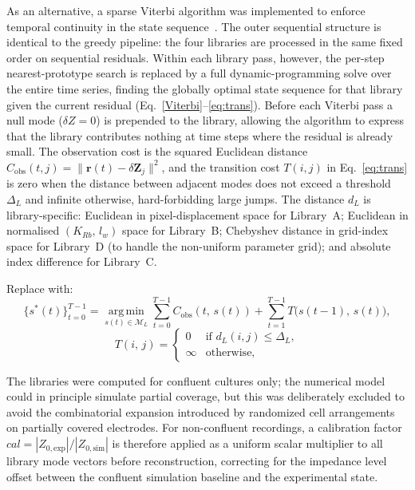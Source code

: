 \documentclass[english, 10pt, a4paper]{article}
\begin{document}
As an alternative, a sparse Viterbi algorithm was implemented to enforce temporal continuity in the state sequence~\cite{forney2005viterbi}. The outer sequential structure is identical to the greedy pipeline: the four libraries are processed in the same fixed order on sequential residuals. Within each library pass, however, the per-step nearest-prototype search is replaced by a full dynamic-programming solve over the entire time series, finding the globally optimal state sequence for that library given the current residual (Eq.~\ref{Viterbi}--\ref{eq:trans}). Before each Viterbi pass a null mode ($\delta Z = 0$) is prepended to the library, allowing the algorithm to express that the library contributes nothing at time steps where the residual is already small. The observation cost is the squared Euclidean distance $C_\text{obs}(t,j)=\|\mathbf{r}(t)-\delta\mathbf{Z}_j\|^2$, and the transition cost $T(i,j)$ in Eq.~\ref{eq:trans} is zero when the distance between adjacent modes does not exceed a threshold $\Delta_L$ and infinite otherwise, hard-forbidding large jumps. The distance $d_L$ is library-specific: Euclidean in pixel-displacement space for Library~A; Euclidean in normalised $(K_{Rb},\,l_w)$ space for Library~B; Chebyshev distance in grid-index space for Library~D (to handle the non-uniform parameter grid); and absolute index difference for Library~C.

Replace with:
\begin{equation}\label{Viterbi}
 \{s^*(t)\}_{t=0}^{T-1} = \operatorname*{arg\,min}_{s(t)\in\mathcal{M}_L}
\sum_{t=0}^{T-1} C_\text{obs}(t,\,s(t))
   + \sum_{t=1}^{T-1} T\!\bigl(s(t{-}1),\,s(t)\bigr),
\end{equation}
\begin{equation}\label{eq:trans}
 T(i,\,j) =
 \begin{cases}
   0      & \text{if } d_L(i,j) \le \Delta_L, \\
   \infty & \text{otherwise,}
 \end{cases}
\end{equation}

The libraries were computed for confluent cultures only; the numerical model could in principle simulate partial coverage, but this was deliberately excluded to avoid the combinatorial expansion introduced by randomized cell arrangements on partially covered electrodes. For non-confluent recordings, a calibration factor $\mathit{cal} = |Z_{0,\text{exp}}|/|Z_{0,\text{sim}}|$ is therefore applied as a uniform scalar multiplier to all library mode vectors before reconstruction, correcting for the impedance level offset between the confluent simulation baseline and the experimental state.
\end{document}
